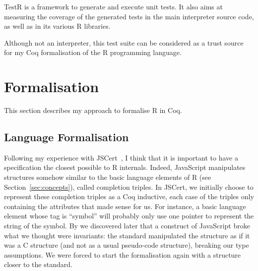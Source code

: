 \documentclass{article}
\newcommand\Coq{Coq}
\newcommand\R{R}
\newcommand\Cn{C}
\begin{document}
TestR is a framework to generate and execute unit tests.
It also aims at measuring the coverage of the generated tests
in the main interpreter source code,
as well as in its various \R{} libraries.

Although not an interpreter,
this test suite can be considered as a trust source
for my \Coq{} formalisation of the \R{} programming language.


\section{Formalisation}
\label{sec:formalisation}

This section describes my approach to formalise \R{} in \Coq{}.

\subsection{Language Formalisation}
\label{sec:language:formalisation}

Following my experience with JSCert~\parencite{bodin2014trusted},
I think that it is important to have a specification
the closest possible to \R{} internals.
Indeed, JavaScript manipulates structures somehow similar
to the basic language elements of \R{} (see Section~\ref{sec:concepts}),
called completion triples.
In JSCert, we initially choose to represent these completion triples
as a \Coq{} inductive,
each case of the triples only containing the attributes that made sense for us.
For instance, a basic language element whose tag is “symbol”
will probably only use one pointer to represent the string of the symbol.
By we discovered later that a construct of JavaScript %
broke what we thought were invariants:
the standard manipulated the structure as if it was a \Cn{} structure
(and not as a usual pseudo-code structure),
breaking our type assumptions.
We were forced to start the formalisation again with a structure
closer to the standard.
\end{document}
